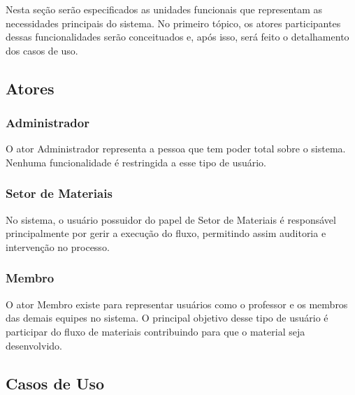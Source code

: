 Nesta seção serão especificados as unidades funcionais que representam as necessidades principais do sistema. No primeiro tópico, os atores participantes dessas funcionalidades serão conceituados e, após isso, será feito o detalhamento dos casos de uso.

\subsection{Atores}

\subsubsection{Administrador}

O ator Administrador representa a pessoa que tem poder total sobre o sistema. Nenhuma funcionalidade é restringida a esse tipo de usuário.

\subsubsection{Setor de Materiais}

No sistema, o usuário possuidor do papel de Setor de Materiais é responsável principalmente por gerir a execução do fluxo, permitindo assim auditoria e intervenção no processo.

\subsubsection{Membro}

O ator Membro existe para representar usuários como o professor e os membros das demais equipes no sistema. O principal objetivo desse tipo de usuário é participar do fluxo de materiais contribuindo para que o material seja desenvolvido.

\subsection{Casos de Uso}
     
